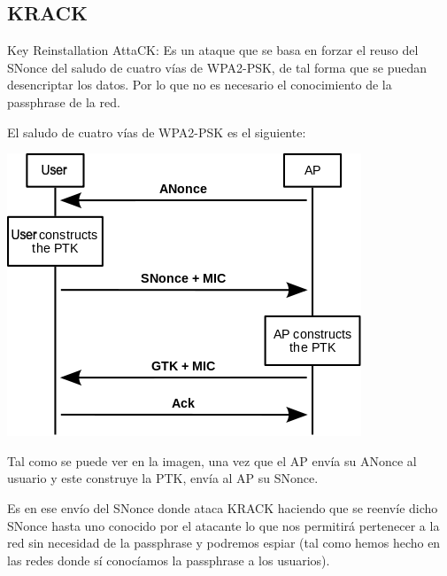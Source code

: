 \subsection{KRACK}
\hypertarget{krack}{}
Key Reinstallation AttaCK: Es un ataque que se basa en forzar el reuso del SNonce del saludo de cuatro vías de WPA2-PSK, de tal forma que se puedan desencriptar los datos. Por lo que no es necesario el conocimiento de la passphrase de la red.

El saludo de cuatro vías de WPA2-PSK es el siguiente:
\begin{center}
	\includegraphics[scale=0.7]{Saludo4vias.png}
\end{center}
Tal como se puede ver en la imagen, una vez que el AP envía su ANonce al usuario y este construye la PTK, envía al AP su SNonce.

Es en ese envío del SNonce donde ataca KRACK haciendo que se reenvíe dicho SNonce hasta uno conocido por el atacante lo que nos permitirá pertenecer a la red sin necesidad de la passphrase y podremos espiar (tal como hemos hecho en las redes donde sí conocíamos la passphrase a los usuarios).

